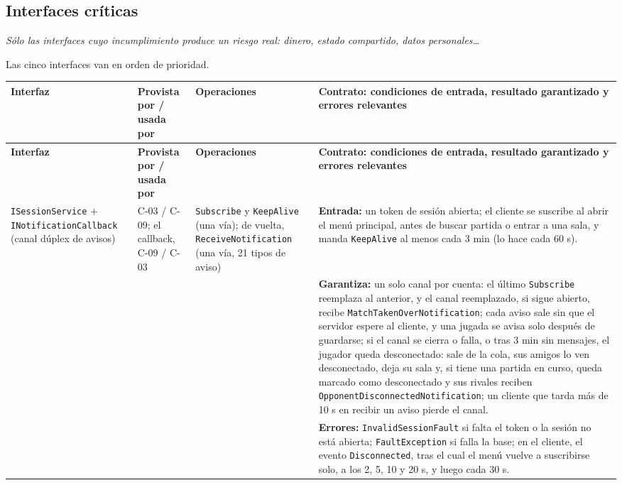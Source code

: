 \documentclass[11pt,letterpaper]{article}
\newcommand{\hint}[1]{{\itshape\color{black!70}#1}\par} %
\newcommand{\hd}[1]{\textbf{\small #1}}
\newcommand{\headrow}{\rowcolor{SADHead}}
\begin{document}
\subsection{Interfaces críticas}
\hint{Sólo las interfaces cuyo incumplimiento produce un riesgo real: dinero, estado compartido, datos personales…}
Las cinco interfaces van en orden de prioridad.
\begin{xltabular}{\linewidth}{|>{\small\raggedright\arraybackslash}p{3cm}|>{\small\raggedright\arraybackslash}p{1.8cm}|>{\small\raggedright\arraybackslash}p{2.8cm}|Y|}\hline
  \headrow\hd{Interfaz} & \hd{Provista por / usada por} & \hd{Operaciones} & \hd{Contrato: condiciones de entrada, resultado garantizado y errores relevantes}\\\hline
  \endfirsthead
  \headrow\hd{Interfaz} & \hd{Provista por / usada por} & \hd{Operaciones} & \hd{Contrato: condiciones de entrada, resultado garantizado y errores relevantes}\\\hline
  \endhead
  \texttt{ISessionService} + \texttt{INotification\allowbreak Callback} (canal dúplex de avisos) & C-03 / C-09; el callback, C-09 / C-03 & \texttt{Subscribe} y \texttt{KeepAlive} (una vía); de vuelta, \texttt{Receive\allowbreak Notification} (una vía, 21 tipos de aviso) & \textbf{Entrada:} un token de sesión abierta; el cliente se suscribe al abrir el menú principal, antes de buscar partida o entrar a una sala, y manda \texttt{KeepAlive} al menos cada 3 min (lo hace cada 60 s).\\
    & & & \textbf{Garantiza:} un solo canal por cuenta: el último \texttt{Subscribe} reemplaza al anterior, y el canal reemplazado, si sigue abierto, recibe \texttt{MatchTakenOver\allowbreak Notification}; cada aviso sale sin que el servidor espere al cliente, y una jugada se avisa solo después de guardarse; si el canal se cierra o falla, o tras 3 min sin mensajes, el jugador queda desconectado: sale de la cola, sus amigos lo ven desconectado, deja su sala y, si tiene una partida en curso, queda marcado como desconectado y sus rivales reciben \texttt{OpponentDisconnected\allowbreak Notification}; un cliente que tarda más de 10 s en recibir un aviso pierde el canal.\\
    & & & \textbf{Errores:} \texttt{InvalidSessionFault} si falta el token o la sesión no está abierta; \texttt{FaultException} si falla la base; en el cliente, el evento \texttt{Disconnected}, tras el cual el menú vuelve a suscribirse solo, a los 2, 5, 10 y 20 s, y luego cada 30 s.\\\hline

\end{xltabular}
\end{document}
